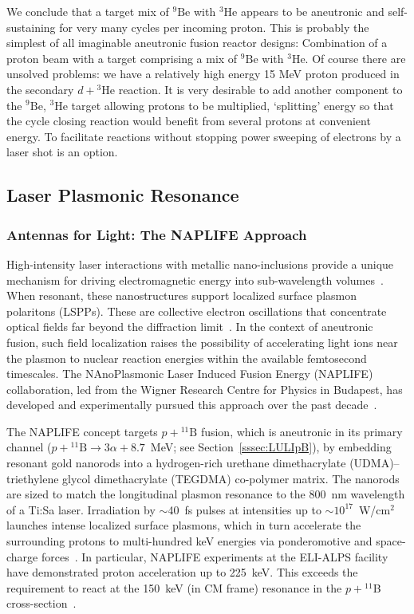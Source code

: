 \documentclass[particles,article,accept,pdftex,moreauthors]{Definitions/mdpi}
\begin{document}
We conclude that a target mix of ${}^9\mathrm{Be}$ with ${}^{3}\mathrm{He}$ appears to be aneutronic and self-sustaining for very many cycles per incoming proton. This is probably the simplest of all imaginable aneutronic fusion reactor designs: Combination of a proton beam with a target comprising a mix of ${}^9\mathrm{Be}$ with ${}^{3}\mathrm{He}$. Of course there are unsolved problems: we have a relatively high energy 15 MeV proton produced in the secondary $d+{}^{3}\mathrm{He}$ reaction. It is very desirable to add another component to the ${}^9\mathrm{Be}$, ${}^{3}\mathrm{He}$ target allowing protons to be multiplied, `splitting' energy so that the cycle closing reaction would benefit from several protons at convenient energy. To facilitate reactions without stopping power sweeping of electrons by a laser shot is an option.
 
\subsection{Laser Plasmonic Resonance}\label{ssec:Plasmonics}
\subsubsection{Antennas for Light: The NAPLIFE Approach}\label{sssec:Anten}
High-intensity laser interactions with metallic nano-inclusions provide a unique mechanism for driving electromagnetic energy into sub-wavelength volumes~\cite{kroo2016plasmonic}. When resonant, these nanostructures support localized surface plasmon polaritons (LSPPs). These are collective electron oscillations that concentrate optical fields far beyond the diffraction limit~\cite{Schuck:2005,Novotny:2007,Novotny:2011}. In the context of aneutronic fusion, such field localization raises the possibility of accelerating light ions near the plasmon to nuclear reaction energies within the available femtosecond timescales. The NAnoPlasmonic Laser Induced Fusion Energy (NAPLIFE) collaboration, led from the Wigner Research Centre for Physics in Budapest, has developed and experimentally pursued this approach over the past decade~\cite{Biro:2025EPJ,Csernai:2025EPJ,tamas2025nanofusion}.

The NAPLIFE concept targets $p+{}^{11}\mathrm{B}$ fusion, which is aneutronic in its primary channel ($p+{}^{11}\mathrm{B}\to 3\alpha + 8.7$~MeV; see Section~\ref{sssec:LULIpB}), by embedding resonant gold nanorods into a hydrogen-rich urethane dimethacrylate (UDMA)--triethylene glycol dimethacrylate (TEGDMA) co-polymer matrix. The nanorods are sized to match the longitudinal plasmon resonance to the 800~nm wavelength of a Ti:Sa laser. Irradiation by $\sim$40~fs pulses at intensities up to ${\sim}10^{17}$~W/cm${}^2$ launches intense localized surface plasmons, which in turn accelerate the surrounding protons to multi-hundred keV energies via ponderomotive and space-charge forces~\cite{Papp:2022PRXEnergy,Papp:2023FrontPhys}. In particular, NAPLIFE experiments at the ELI-ALPS facility have demonstrated proton acceleration up to 225~keV. This exceeds the requirement to react at the 150~keV (in CM frame) resonance in the $p+{}^{11}$B cross-section~\cite{Kroo2024pB,Kedves:2025EPJ}.
\end{document}
